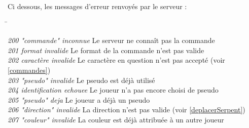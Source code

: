 \par

Ci dessous, les messages d'erreur renvoyés par le serveur : 

\begin{tabbing}
\hspace{5cm}\=\kill

 \textit{200 "commande" inconnue} 		\> Le serveur ne connaît pas la commande \\
 \textit{201 format invalide}			\> Le format de la commande n'est pas valide \\
 \textit{202 caractère invalide}		\> Le caractère en question n'est pas accepté (voir \ref{commandes}) \\
 \textit{203 "pseudo" invalide}			\> Le pseudo est déjà utilisé \\
 \textit{204 identification echouee}	\> Le joueur n'a pas encore choisi de pseudo \\
 \textit{205 "pseudo" deja} 			\> Le joueur a déjà un pseudo \\
 \textit{206 "direction" invalide}		\> La direction n'est pas valide (voir \ref{deplacerSerpent}) \\
 \textit{207 "couleur" invalide}		\> La couleur est déjà attribuée à un autre joueur \\
 
\end{tabbing} 
